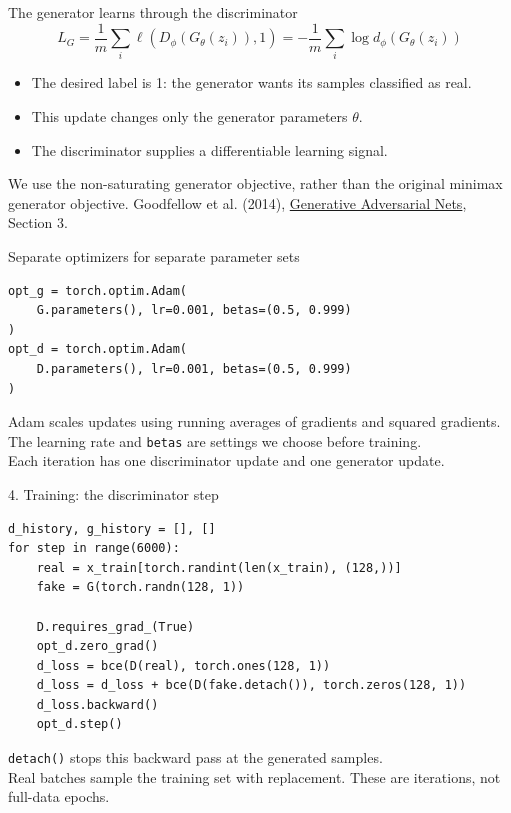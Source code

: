 \documentclass[aspectratio=169,11pt]{beamer}
\newcommand{\ganref}{\vfill{\tiny\color{gray}Goodfellow et al. (2014), \href{https://arxiv.org/abs/1406.2661}{Generative Adversarial Nets}, Section 3.}}
\begin{document}
\begin{frame}{The generator learns through the discriminator}
\large
\[L_G=\frac1m\sum_i\ell(D_\phi(G_\theta(z_i)),1)
=-\frac1m\sum_i\log d_\phi(G_\theta(z_i))\]
\normalsize
\begin{itemize}\setlength\itemsep{4mm}
\item The desired label is 1: the generator wants its samples classified as real.
\item This update changes only the generator parameters $\theta$.
\item The discriminator supplies a differentiable learning signal.
\end{itemize}
\vspace{3mm}
We use the \alert{non-saturating} generator objective, rather than the original minimax generator objective.
\ganref
\end{frame}

\begin{frame}[fragile]{Separate optimizers for separate parameter sets}
\begin{lstlisting}
opt_g = torch.optim.Adam(
    G.parameters(), lr=0.001, betas=(0.5, 0.999)
)
opt_d = torch.optim.Adam(
    D.parameters(), lr=0.001, betas=(0.5, 0.999)
)
\end{lstlisting}
\vspace{3mm}
Adam scales updates using running averages of gradients and squared gradients.\\[3mm]
The learning rate and \texttt{betas} are settings we choose before training.\\[3mm]
Each iteration has one discriminator update and one generator update.
\end{frame}

\begin{frame}[fragile]{4. Training: the discriminator step}
\begin{lstlisting}[basicstyle=\ttfamily\footnotesize]
d_history, g_history = [], []
for step in range(6000):
    real = x_train[torch.randint(len(x_train), (128,))]
    fake = G(torch.randn(128, 1))

    D.requires_grad_(True)
    opt_d.zero_grad()
    d_loss = bce(D(real), torch.ones(128, 1))
    d_loss = d_loss + bce(D(fake.detach()), torch.zeros(128, 1))
    d_loss.backward()
    opt_d.step()
\end{lstlisting}
\vspace{2mm}
\texttt{detach()} stops this backward pass at the generated samples.\\[2mm]
Real batches sample the training set with replacement. These are iterations, not full-data epochs.
\end{frame}
\end{document}
